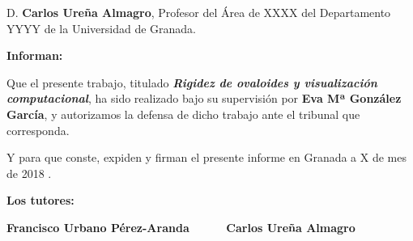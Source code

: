 D. \textbf{Carlos Ureña Almagro}, Profesor del Área de XXXX del Departamento YYYY de la Universidad de Granada.


\vspace{0.5cm}

\textbf{Informan:}

\vspace{0.5cm}

Que el presente trabajo, titulado \textit{\textbf{Rigidez de ovaloides y visualización computacional}},
ha sido realizado bajo su supervisión por \textbf{Eva Mª González García}, y autorizamos la defensa de dicho trabajo ante el tribunal que corresponda.

\vspace{0.5cm}

Y para que conste, expiden y firman el presente informe en Granada a X de mes de 2018 .

\vspace{1cm}

\textbf{Los tutores:}

\vspace{5cm}

\noindent \textbf{Francisco Urbano Pérez-Aranda \ \ \ \ \ Carlos Ureña Almagro}





